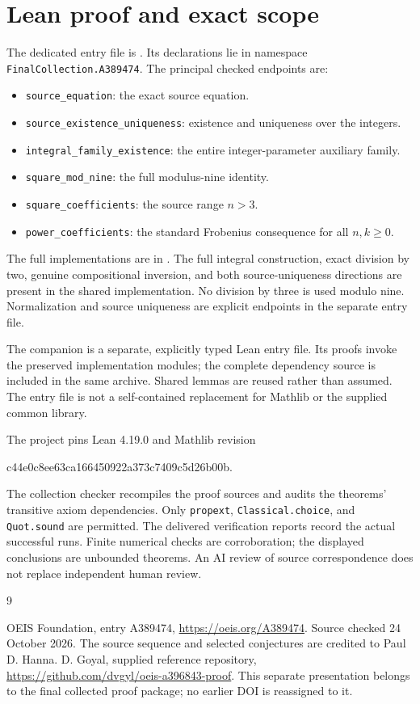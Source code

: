 \documentclass[11pt,a4paper]{article}
\theoremstyle{remark}
\begin{document}
\section{Lean proof and exact scope}
The dedicated entry file is . Its declarations lie in namespace \texttt{FinalCollection.A389474}. The principal checked endpoints are:
\begin{itemize}[nosep]
\item \texttt{source\_equation}: the exact source equation.
\item \texttt{source\_existence\_uniqueness}: existence and uniqueness over the integers.
\item \texttt{integral\_family\_existence}: the entire integer-parameter auxiliary family.
\item \texttt{square\_mod\_nine}: the full modulus-nine identity.
\item \texttt{square\_coefficients}: the source range $n>3$.
\item \texttt{power\_coefficients}: the standard Frobenius consequence for all $n,k\ge0$.
\end{itemize}
The full implementations are in .
The full integral construction, exact division by two, genuine compositional inversion, and both source-uniqueness directions are present in the shared implementation. No division by three is used modulo nine. Normalization and source uniqueness are explicit endpoints in the separate entry file.

The companion is a separate, explicitly typed Lean entry file. Its proofs
invoke the preserved implementation modules; the complete dependency source
is included in the same archive. Shared lemmas are reused rather than
assumed. The entry file is not a self-contained replacement for Mathlib or
the supplied common library.

The project pins Lean 4.19.0 and Mathlib revision
\begin{center}\small\ttfamily
c44e0c8ee63ca166450922a373c7409c5d26b00b.
\end{center}
The collection checker recompiles the proof sources and audits the
theorems' transitive axiom dependencies. Only \texttt{propext},
\texttt{Classical.choice}, and \texttt{Quot.sound} are permitted.
The delivered verification reports record the actual successful runs.
Finite numerical checks are corroboration; the displayed conclusions are
unbounded theorems. An AI review of source correspondence does not replace
independent human review.
\begin{thebibliography}{9}
\raggedright
{} OEIS Foundation, entry A389474,
\url{https://oeis.org/A389474}. Source checked 24 October 2026.
The source sequence and selected conjectures are credited to Paul D. Hanna.
 D. Goyal, supplied reference repository,
\url{https://github.com/dvgyl/oeis-a396843-proof}.
This separate presentation belongs to the final collected proof package;
no earlier DOI is reassigned to it.
\end{thebibliography}
\end{document}
